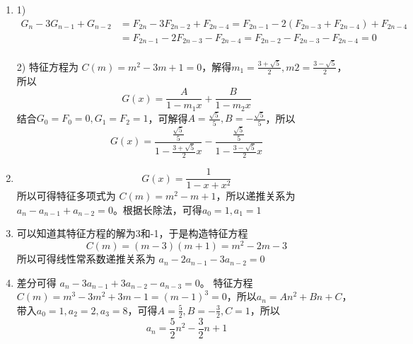 \documentclass[a4paper]{article}
\begin{document}
\courseheader
\name{}

\begin{enumerate}[]
  \setlength{\itemsep}{3\parskip}
  
\item
\begin{solution}
    1) \begin{align*}
        G_n-3G_{n-1}+G_{n-2}&=F_{2n}-3F_{2n-2}+F_{2n-4}= F_{2n-1} -2(F_{2n-3}+F_{2n-4}) +F_{2n-4} \\
        &= F_{2n-1} -2F_{2n-3} -F_{2n-4} = F_{2n-2} - F_{2n-3} - F_{2n-4} = 0 \\
    \end{align*}

    2) 特征方程为 $C(m) = m^2-3m+1 =0$，解得$m_1=\frac{3+\sqrt{5}}{2},m2=\frac{3-\sqrt{5}}{2}$，所以
    \begin{equation*}
        G(x) = \frac{A}{1-m_1x} + \frac{B}{1-m_2x}
    \end{equation*}
    结合$G_0=F_0=0,G_1=F_2=1$，可解得$A=\frac{\sqrt{5}}{5},B=-\frac{\sqrt{5}}{5}$，所以
    \begin{equation*}
        G(x)=\frac{\frac{\sqrt{5}}{5}}{1-\frac{3+\sqrt{5}}{2}x} -  \frac{\frac{\sqrt{5}}{5}}{1-\frac{3-\sqrt{5}}{2}x}
    \end{equation*}
\end{solution}


\item
\begin{solution}
\begin{equation*}
    G(x)=\frac{1}{1-x+x^2}
\end{equation*}
所以可得特征多项式为 $C(m)=m^2-m+1$，所以递推关系为 $a_n-a_{n-1}+a_{n-2}=0$。根据长除法，可得$a_0=1,a_1=1$
\end{solution}


\item 
\begin{solution}
    可以知道其特征方程的解为3和-1，于是构造特征方程
    \begin{equation*}
        C(m)=(m-3)(m+1)= m^2-2m-3
    \end{equation*}
    所以可得线性常系数递推关系为 $a_n-2a_{n-1}-3a_{n-2}=0$
\end{solution}

\item 
\begin{solution}
    差分可得
    $a_n-3a_{n-1}+3a_{n-2}-a_{n-3}=0$。
    特征方程$C(m)=m^3-3m^2+3m-1=(m-1)^3=0$，所以$a_n=An^2+Bn+C$，带入$a_0=1,a_2=2,a_3=8$，可得$A=\frac{5}{2},B=-\frac{3}{2},C=1$，所以
    \begin{equation*}
        a_n=\frac{5}{2}n^2-\frac{3}{2}n+1
    \end{equation*}
\end{solution}


\end{enumerate}
\end{document}
